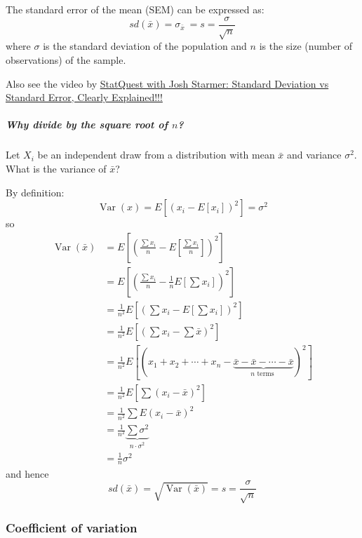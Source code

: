 \documentclass[
  12pt,
  oneside]{book}
\theoremstyle{definition}
\theoremstyle{definition}
\theoremstyle{definition}
\theoremstyle{definition}
\theoremstyle{remark}
\begin{document}
The standard error of the mean (SEM) can be expressed as:
\[
sd(\bar{x})=\sigma_{\bar {x}}\ = s = {\frac {\sigma }{\sqrt {n}}}
\]
where \(\sigma\) is the standard deviation of the population and \(n\) is the size (number of observations) of the sample.

Also see the video by \href{https://youtu.be/A82brFpdr9g}{StatQuest with Josh Starmer: Standard Deviation vs Standard Error, Clearly Explained!!!}

\hypertarget{why-divide-by-the-square-root-of-n}{%
\subparagraph*{\texorpdfstring{Why divide by the square root of \(n\)?}{Why divide by the square root of n?}}\label{why-divide-by-the-square-root-of-n}}

Let \(X_{i}\) be an independent draw from a distribution with mean \(\bar{x}\) and variance \(\sigma^{2}\).
What is the variance of \(\bar{x}\)?

By definition:
\[
\operatorname{Var}(x)=E\left[\left(x_{i}-E\left[x_{i}\right]\right)^{2}\right]=\sigma^{2}
\]
so
\begin{align*}
\operatorname{Var}(\bar{x})&=E\left[\left(\frac{\sum x_{i}}{n}-E \left[\frac{\sum x_{i}}{n}\right]\right)^{2}\right]\\
&=E\left[\left(\frac{\sum x_{i}}{n}-\frac{1}{n} E\left[ \sum x_{i}\right]\right)^{2}\right]\\
&=\frac{1}{n^{2}} E\left[\left(\sum x_{i}-E\left[\sum x_{i}\right]\right)^{2}\right]\\
&=\frac{1}{n^{2}} E\left[\left(\sum x_{i}- \sum \bar{x}\right)^{2}\right]\\
&=\frac{1}{n^{2}} E\left[(x_{1}+x_{2}+\cdots+x_{n}-\underbrace{\bar{x}-\bar{x}-\cdots -\bar{x}}_{n \text{ terms }})^{2}\right]\\
&=\frac{1}{n^{2}} E\left[\sum\left(x_{i}-\bar{x}\right)^{2}\right]\\
&=\frac{1}{n^{2}} \sum E\left(x_{i}-\bar{x}\right)^{2}\\
&=\frac{1}{n^{2}} \underbrace{\sum \sigma^{2}}_{n\cdot \sigma^{2}}\\
&=\frac{1}{n} \sigma^{2}
\end{align*}
and hence
\[
sd(\bar x)=\sqrt{\operatorname{Var}(\bar{x})}=s={\frac {\sigma }{\sqrt {n}}}
\]

\hypertarget{coefficient-of-variation}{%
\subsubsection{Coefficient of variation}\label{coefficient-of-variation}}
\end{document}
